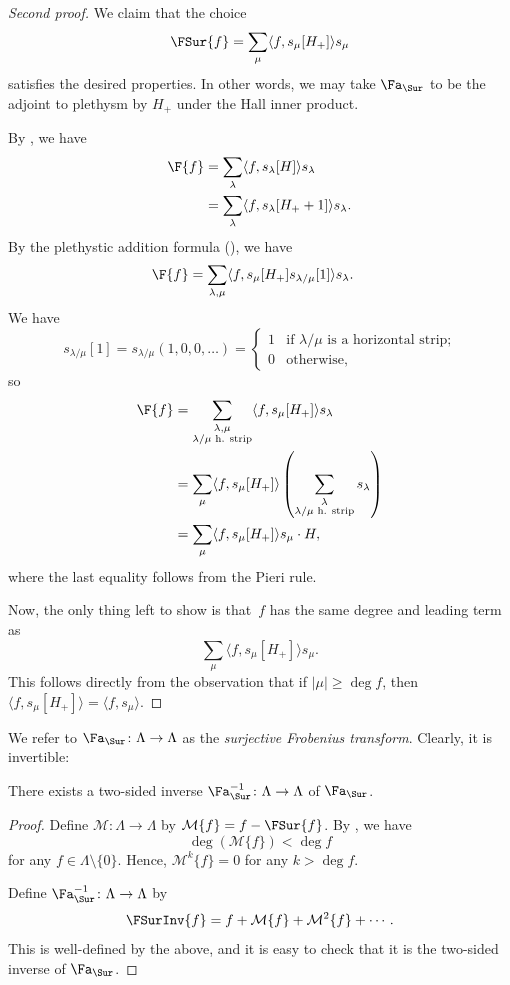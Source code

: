 \begin{proof}[Second proof]
We claim that the choice
\[\FSur{f} = \sum_{\mu} \langle f, s_\mu[H_+]\rangle s_\mu\] satisfies the desired properties. In other words, we may take $\Fa_{\Sur}$ to be the adjoint to plethysm by $H_+$ under the Hall inner product.

By , we have
\begin{align*}
    \F{f} &= \sum_{\lambda} \langle f, s_\lambda[H]\rangle s_\lambda \\
    &= \sum_{\lambda} \langle f, s_\lambda[H_+ + 1]\rangle s_\lambda.
\end{align*}
By the plethystic addition formula (), we have
\begin{align*}
    \F{f} &= \sum_{\lambda, \mu} \langle f, s_\mu[H_+] s_{\lambda / \mu}[1]\rangle s_\lambda.
\end{align*}
We have \[s_{\lambda / \mu}[1] = s_{\lambda / \mu}(1, 0, 0, \ldots) = \begin{cases} 1 & \mbox{if $\lambda / \mu$ is a horizontal strip;} \\ 0 & \mbox{otherwise,}\end{cases}\] so 
\begin{align*}
    \F{f} &= \sum_{\substack{\lambda, \mu \\ \text{$\lambda/\mu$ h. strip}}} \langle f, s_\mu[H_+]\rangle s_\lambda \\
    &= \sum_{\mu}\langle f, s_\mu[H_+] \rangle \left(\sum_{\substack{\lambda \\ \text{$\lambda/\mu$ h. strip}}}s_\lambda\right) \\
    &= \sum_{\mu}\langle f, s_\mu[H_+] \rangle s_\mu \cdot H,
\end{align*}
where the last equality follows from the Pieri rule.

Now, the only thing left to show is that~$f$ has the same degree and leading term as \[\sum_{\mu} \langle f, s_\mu[H_+]\rangle s_\mu.\] This follows directly from the observation that if $|\mu| \geq \deg f$, then $\langle f, s_\mu[H_+]\rangle = \langle f, s_\mu\rangle$.
\end{proof}
We refer to $\Fa_{\Sur} \colon \Lambda \to \Lambda$ as the \emph{surjective Frobenius transform}. Clearly, it is invertible:
\begin{coro}
    There exists a two-sided inverse $\Fa_{\Sur}^{-1} \colon \Lambda \to \Lambda$ of $\Fa_{\Sur}$.
\end{coro}
\begin{proof}
    Define $\mathcal{M} \colon \Lambda \to \Lambda$ by $\mathcal{M}\{f\} = f - \FSur{f}$. By , we have \[\deg(\mathcal{M}\{f\}) < \deg f\] for any $f \in \Lambda \setminus \{0\}$. Hence, $\mathcal{M}^k\{f\} = 0$ for any $k > \deg f$.

    Define $\Fa_{\Sur}^{-1} \colon \Lambda \to \Lambda$ by \[\FSurInv{f} = f + \mathcal{M}\{f\} + \mathcal{M}^2\{f\} + \cdots.\] This is well-defined by the above, and it is easy to check that it is the two-sided inverse of $\Fa_{\Sur}$.
\end{proof}

